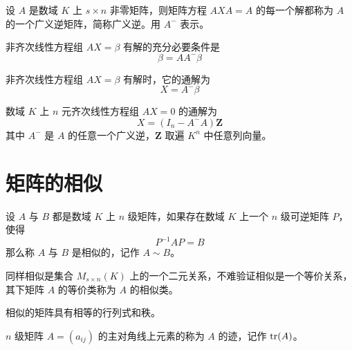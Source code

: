 \begin{definition}
    设 $A$ 是数域 $K$ 上 $s\times n$ 非零矩阵，则矩阵方程 $AXA = A$ 的每一个解都称为 $A$ 的一个广义逆矩阵，简称广义逆。用 $A^-$ 表示。
\end{definition}

\begin{theorem}
    非齐次线性方程组 $AX = \beta$ 有解的充分必要条件是
    \[\beta = AA^-\beta\]
\end{theorem}

\begin{theorem}
    非齐次线性方程组 $AX = \beta$ 有解时，它的通解为
    \[X  = A^-\beta\]
\end{theorem}

\begin{theorem}
    数域 $K$ 上 $n$ 元齐次线性方程组 $AX = 0$ 的通解为
    \[X  = (I_n - A^-A)\boldsymbol{Z}\]
    其中 $A^-$ 是 $A$ 的任意一个广义逆，$\boldsymbol{Z}$ 取遍 $K^n$ 中任意列向量。
\end{theorem}


\section{矩阵的相似}

\begin{definition}
    设 $A$ 与 $B$ 都是数域 $K$ 上 $n$ 级矩阵，如果存在数域 $K$ 上一个 $n$ 级可逆矩阵 $P$，使得
    \[P^{-1}AP = B\]
    那么称 $A$ 与 $B$ 是相似的，记作 $A\sim B$。
\end{definition}

同样相似是集合 $M_{s\times n}(K)$ 上的一个二元关系，不难验证相似是一个等价关系，其下矩阵 $A$ 的等价类称为 $A$ 的相似类。

相似的矩阵具有相等的行列式和秩。

\begin{definition}
    $n$ 级矩阵 $A=(a_{ij})$ 的主对角线上元素的称为 $A$ 的迹，记作 $\operatorname{tr}(A)$。
\end{definition}

